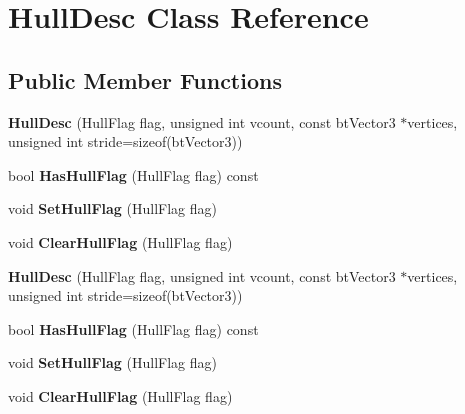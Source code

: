 \hypertarget{classHullDesc}{}\section{Hull\+Desc Class Reference}
\label{classHullDesc}
\subsection*{Public Member Functions}
\begin{DoxyCompactItemize}
\item 
\mbox{\label{classHullDesc_a024e00a7890b4823597f00d5dbee16ac}} 
{\bfseries Hull\+Desc} (Hull\+Flag flag, unsigned int vcount, const bt\+Vector3 $\ast$vertices, unsigned int stride=sizeof(bt\+Vector3))
\item 
\mbox{\label{classHullDesc_a0e869f5de292124d88fa6a1493743f73}} 
bool {\bfseries Has\+Hull\+Flag} (Hull\+Flag flag) const
\item 
\mbox{\label{classHullDesc_afe1e5a82f88b98999295d410b33b25f0}} 
void {\bfseries Set\+Hull\+Flag} (Hull\+Flag flag)
\item 
\mbox{\label{classHullDesc_aac16be27dd531c40d2b76ac0f990a788}} 
void {\bfseries Clear\+Hull\+Flag} (Hull\+Flag flag)
\item 
\mbox{\label{classHullDesc_a024e00a7890b4823597f00d5dbee16ac}} 
{\bfseries Hull\+Desc} (Hull\+Flag flag, unsigned int vcount, const bt\+Vector3 $\ast$vertices, unsigned int stride=sizeof(bt\+Vector3))
\item 
\mbox{\label{classHullDesc_a0e869f5de292124d88fa6a1493743f73}} 
bool {\bfseries Has\+Hull\+Flag} (Hull\+Flag flag) const
\item 
\mbox{\label{classHullDesc_afe1e5a82f88b98999295d410b33b25f0}} 
void {\bfseries Set\+Hull\+Flag} (Hull\+Flag flag)
\item 
\mbox{\label{classHullDesc_aac16be27dd531c40d2b76ac0f990a788}} 
void {\bfseries Clear\+Hull\+Flag} (Hull\+Flag flag)
\end{DoxyCompactItemize}
